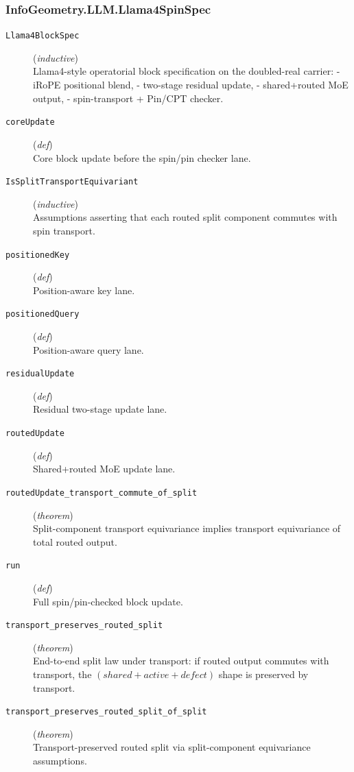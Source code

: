 \documentclass[11pt,a4paper]{article}
\begin{document}
\subsubsection*{InfoGeometry.LLM.Llama4SpinSpec}
\begin{description}
  \item[\texttt{Llama4BlockSpec}] (\textit{inductive}) \\ Llama4-style operatorial block specification on the doubled-real carrier: 
- iRoPE positional blend, 
- two-stage residual update, 
- shared+routed MoE output, 
- spin-transport + Pin/CPT checker.
  \item[\texttt{coreUpdate}] (\textit{def}) \\ Core block update before the spin/pin checker lane.
  \item[\texttt{IsSplitTransportEquivariant}] (\textit{inductive}) \\ Assumptions asserting that each routed split component commutes with spin transport.
  \item[\texttt{positionedKey}] (\textit{def}) \\ Position-aware key lane.
  \item[\texttt{positionedQuery}] (\textit{def}) \\ Position-aware query lane.
  \item[\texttt{residualUpdate}] (\textit{def}) \\ Residual two-stage update lane.
  \item[\texttt{routedUpdate}] (\textit{def}) \\ Shared+routed MoE update lane.
  \item[\texttt{routedUpdate\_transport\_commute\_of\_split}] (\textit{theorem}) \\ Split-component transport equivariance implies transport equivariance of total routed output.
  \item[\texttt{run}] (\textit{def}) \\ Full spin/pin-checked block update.
  \item[\texttt{transport\_preserves\_routed\_split}] (\textit{theorem}) \\ End-to-end split law under transport: 
if routed output commutes with transport, the $(shared + active + defect)$ 
shape is preserved by transport.
  \item[\texttt{transport\_preserves\_routed\_split\_of\_split}] (\textit{theorem}) \\ Transport-preserved routed split via split-component equivariance assumptions.
\end{description}
\end{document}
